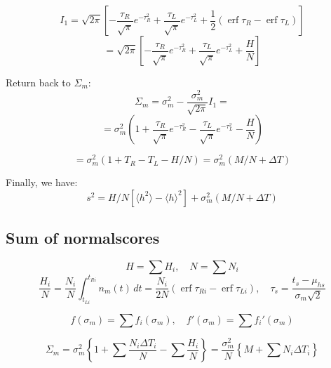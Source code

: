 \documentclass[12pt]{article}
\begin{document}
\[
    I_1 = \sqrt{2\pi}
    \left[
        -\frac{\tau_R}{\sqrt{\pi}} e^{-\tau_R^2} +
        \frac{\tau_L}{\sqrt{\pi}} e^{-\tau_L^2} +
        \frac{1}{2} \left(
        \operatorname{erf} \tau_R -
        \operatorname{erf} \tau_L
        \right)
    \right]
\]
\[
    = \sqrt{2\pi}
    \left[
        -\frac{\tau_R}{\sqrt{\pi}} e^{-\tau_R^2} +
        \frac{\tau_L}{\sqrt{\pi}} e^{-\tau_L^2} +
        \frac{H}{N}
    \right]
\]

Return back to \(\Sigma_m\):
\[
\Sigma_m = \sigma_m^2 - \frac{\sigma_m^2}{\sqrt{2\pi}} I_1 =
\]
\[
= \sigma_m^2
\left(
    1 +
    \frac{\tau_R}{\sqrt{\pi}} e^{-\tau_R^2} -
    \frac{\tau_L}{\sqrt{\pi}} e^{-\tau_L^2} -
    \frac{H}{N}
\right)
\]

\[
= \sigma_m^2
\left(
    1 + T_R - T_L - H / N
\right)
= \sigma_m^2
\left(
    M / N + \Delta T
\right)
\]

Finally, we have:
\[
s^2 =
H/N \left[
    \langle h^2 \rangle - \langle h \rangle^2
\right] +
\sigma_m^2 (M / N + \Delta T)
\]

\subsection*{Sum of normalscores}

\[
    H = \sum H_i, \quad N = \sum N_i
\]
\[
\frac{H_i}{N} = \frac{N_i}{N} \int_{t_{Li}}^{t_{Ri}} n_m(t) \,dt =
\frac{N_i}{2N} \left( \operatorname{erf} \tau_{Ri} - \operatorname{erf} \tau_{Li} \right) , \quad \tau_s = \frac{t_s - \mu_{hs}}{\sigma_m\sqrt{2}}
\]

\[
f(\sigma_m) = \sum f_i(\sigma_m), \quad
f'(\sigma_m) = \sum {f_i}'(\sigma_m)
\]

\[
\Sigma_m =
\sigma_m^2
\left\{
    1 + \sum \frac{N_i \Delta T_i}{N} - \sum \frac{H_i}{N}
\right\} =
\frac{\sigma_m^2}{N}
\left\{
    M +
    \sum N_i \Delta T_i
\right\}
\]
\end{document}
